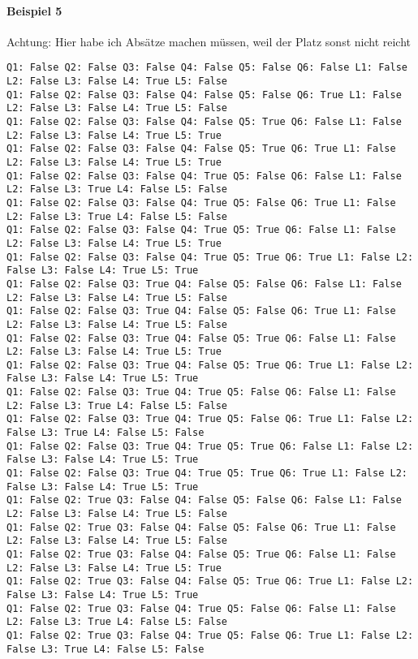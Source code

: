 \documentclass[a4paper,10pt,ngerman]{scrartcl}
\begin{document}
\paragraph{Beispiel 5} 
Achtung: Hier habe ich Absätze machen müssen, weil der Platz sonst nicht reicht 
\begin{lstlisting}[frame=tb,breaklines=true]
Q1: False Q2: False Q3: False Q4: False Q5: False Q6: False L1: False L2: False L3: False L4: True L5: False
Q1: False Q2: False Q3: False Q4: False Q5: False Q6: True L1: False L2: False L3: False L4: True L5: False
Q1: False Q2: False Q3: False Q4: False Q5: True Q6: False L1: False L2: False L3: False L4: True L5: True
Q1: False Q2: False Q3: False Q4: False Q5: True Q6: True L1: False L2: False L3: False L4: True L5: True
Q1: False Q2: False Q3: False Q4: True Q5: False Q6: False L1: False L2: False L3: True L4: False L5: False
Q1: False Q2: False Q3: False Q4: True Q5: False Q6: True L1: False L2: False L3: True L4: False L5: False
Q1: False Q2: False Q3: False Q4: True Q5: True Q6: False L1: False L2: False L3: False L4: True L5: True
Q1: False Q2: False Q3: False Q4: True Q5: True Q6: True L1: False L2: False L3: False L4: True L5: True
Q1: False Q2: False Q3: True Q4: False Q5: False Q6: False L1: False L2: False L3: False L4: True L5: False
Q1: False Q2: False Q3: True Q4: False Q5: False Q6: True L1: False L2: False L3: False L4: True L5: False
Q1: False Q2: False Q3: True Q4: False Q5: True Q6: False L1: False L2: False L3: False L4: True L5: True
Q1: False Q2: False Q3: True Q4: False Q5: True Q6: True L1: False L2: False L3: False L4: True L5: True
Q1: False Q2: False Q3: True Q4: True Q5: False Q6: False L1: False L2: False L3: True L4: False L5: False
Q1: False Q2: False Q3: True Q4: True Q5: False Q6: True L1: False L2: False L3: True L4: False L5: False
Q1: False Q2: False Q3: True Q4: True Q5: True Q6: False L1: False L2: False L3: False L4: True L5: True
Q1: False Q2: False Q3: True Q4: True Q5: True Q6: True L1: False L2: False L3: False L4: True L5: True
Q1: False Q2: True Q3: False Q4: False Q5: False Q6: False L1: False L2: False L3: False L4: True L5: False
Q1: False Q2: True Q3: False Q4: False Q5: False Q6: True L1: False L2: False L3: False L4: True L5: False
Q1: False Q2: True Q3: False Q4: False Q5: True Q6: False L1: False L2: False L3: False L4: True L5: True
Q1: False Q2: True Q3: False Q4: False Q5: True Q6: True L1: False L2: False L3: False L4: True L5: True
Q1: False Q2: True Q3: False Q4: True Q5: False Q6: False L1: False L2: False L3: True L4: False L5: False
Q1: False Q2: True Q3: False Q4: True Q5: False Q6: True L1: False L2: False L3: True L4: False L5: False

\end{lstlisting}
\end{document}
